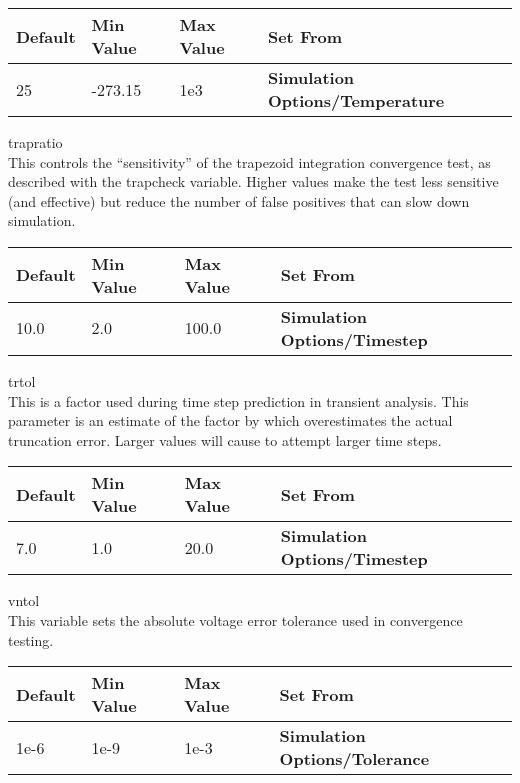 \begin{description}
\begin{tabular}{|l|l|l|l|}\hline
\bf Default & \bf Min Value & \bf Max Value & \bf Set From\\ \hline
25 & -273.15 & 1e3 & \bf Simulation Options/Temperature\\ \hline
\end{tabular}

\item{\et trapratio}\\
This controls the ``sensitivity'' of the trapezoid integration
convergence test, as described with the {\et trapcheck} variable. 
Higher values make the test less sensitive (and effective) but reduce
the number of false positives that can slow down simulation.

\begin{tabular}{|l|l|l|l|}\hline
\bf Default & \bf Min Value & \bf Max Value & \bf Set From\\ \hline
10.0 & 2.0 & 100.0 & \bf Simulation Options/Timestep\\ \hline
\end{tabular}

\item{\et trtol}\\
This is a factor used during time step prediction in transient
analysis.  This parameter is an estimate of the factor by which
{\WRspice} overestimates the actual truncation error.  Larger values
will cause {\WRspice} to attempt larger time steps.

\begin{tabular}{|l|l|l|l|}\hline
\bf Default & \bf Min Value & \bf Max Value & \bf Set From\\ \hline
7.0 & 1.0 & 20.0 & \bf Simulation Options/Timestep\\ \hline
\end{tabular}

\item{\et vntol}\\
This variable sets the absolute voltage error tolerance used in
convergence testing.

\begin{tabular}{|l|l|l|l|}\hline
\bf Default & \bf Min Value & \bf Max Value & \bf Set From\\ \hline
1e-6 & 1e-9 & 1e-3 & \bf Simulation Options/Tolerance\\ \hline
\end{tabular}
     

\end{description}
